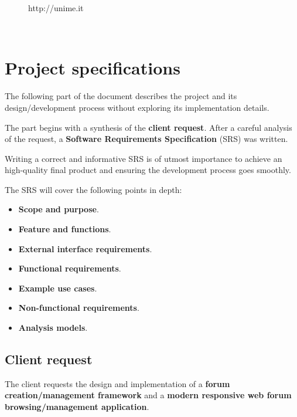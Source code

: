 \documentclass[12pt]{report}
\renewcommand\emph{\textbf}
\begin{document}
\begin{titlepage}
\begin{minipage}{\linewidth}
\begin{minipage}{0.35\linewidth}
\begin{figure}[H]
                    http://unime.it
                \end{figure}
            \end{minipage}
        \end{minipage}\\[3cm]
    \end{titlepage}

    \newcommand{\atoc}[1]{\addtocontents{toc}{#1\par}}
    \renewcommand{\thesection}{\arabic{section}.}
    \tableofcontents
    \newpage

    \part{Project specifications}
        The following part of the document describes the project and its design/development process without exploring its implementation details.

        The part begins with a synthesis of the \emph{client request}. After a careful analysis of the request, a \emph{Software Requirements Specification} (SRS) was written.

        Writing a correct and informative SRS is of utmost importance to achieve an high-quality final product and ensuring the development process goes smoothly.

        The SRS will cover the following points in depth:

        \begin{itemize}
            \item \emph{Scope and purpose}.
            \item \emph{Feature and functions}.
            \item \emph{External interface requirements}.
            \item \emph{Functional requirements}.
            \item \emph{Example use cases}.
            \item \emph{Non-functional requirements}.
            \item \emph{Analysis models}.
        \end{itemize}

        \chapter{Client request}

            The client requests the design and implementation of a \emph{forum creation/management framework} and a \emph{modern responsive web forum browsing/management application}.
\end{document}
